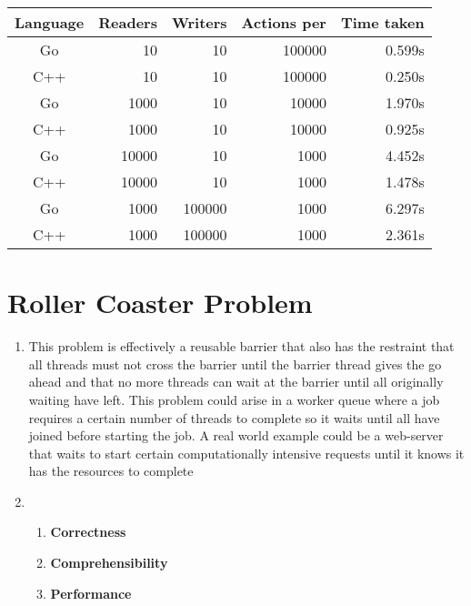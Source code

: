 \documentclass[11pt]{article}
\begin{document}
\begin{tabular}{c r r r r}
Language    & Readers & Writers & Actions per & Time taken \\
\toprule
Go 			& 10 & 10 & 100000 & 0.599s \\
C++         & 10 & 10 & 100000 & 0.250s \\
\cmidrule{1-5}
Go 			& 1000 & 10 & 10000 & 1.970s \\
C++         & 1000 & 10 & 10000 & 0.925s \\
\cmidrule{1-5}
Go 			& 10000 & 10 & 1000 & 4.452s \\
C++         & 10000 & 10 & 1000 & 1.478s \\
\cmidrule{1-5}
Go 			& 1000 & 100000 & 1000 & 6.297s \\
C++         & 1000 & 100000 & 1000 & 2.361s \\
\end{tabular}

\pagebreak

\section{Roller Coaster Problem}
\begin{enumerate}
	\item This problem is effectively a reusable barrier that also has the restraint that all threads must not cross the barrier until the barrier thread gives the go ahead and that no more threads can wait at the barrier until all originally waiting have left. This problem could arise in a worker queue where a job requires a certain number of threads to complete so it waits until all have joined before starting the job. A real world example could be a web-server that waits to start certain computationally intensive requests until it knows it has the resources to complete 
	\item
	\begin{enumerate}
	\item \textbf{Correctness}\linebreak
	
	\item \textbf{Comprehensibility}\linebreak
	
	\item \textbf{Performance}\linebreak
	
	\end{enumerate}
\end{enumerate}
\end{document}
